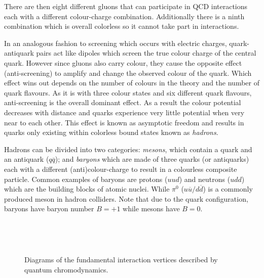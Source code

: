 There are then eight different gluons that can participate in QCD interactions each with a different colour-charge combination. Additionally there is a ninth combination which is overall colorless so it cannot take part in interactions.

In an analogous fashion to screening which occurs with electric charges, quark-antiquark pairs act like dipoles which screen the true colour charge of the central quark. However since gluons also carry colour, they cause the opposite effect (anti-screening) to amplify and change the observed colour of the quark. Which effect wins out depends on the number of colours in the theory and the number of quark flavours. As it is with three colour states and six different quark flavours, anti-screening is the overall dominant effect. As a result the colour potential decreases with distance and quarks experience very little potential when very near to each other. This effect is known as asymptotic freedom and results in quarks only existing within colorless bound states known as \textit{hadrons}.

Hadrons can be divided into two categories: \textit{mesons}, which contain a quark and an antiquark ($q\overline{q}$); and \textit{baryons} which are made of three quarks (or antiquarks) each with a different (anti)colour-charge to result in a colourless composite particle. Common examples of baryons are protons ($uud$) and neutrons ($udd$) which are the building blocks of atomic nuclei. While $\pi^{0}$ ($u\overline{u}/d\overline{d}$) is a commonly produced meson in hadron colliders. Note that due to the quark configuration, baryons have baryon number $B=+1$ while mesons have $B=0$.
  
\begin{figure}
  \begin{minipage}[][][t]{.32\textwidth}
    
     \label{fig:TheoryQCDColour}
  \end{minipage}
  \,
  \begin{minipage}[][][t]{.32\textwidth}
    \centering
    
     \label{fig:TheoryQCDFourGluon}
  \end{minipage}
  \,
  \begin{minipage}[][][t]{.32\textwidth}
    \centering
    
     \label{fig:TheoryQCDThreeGluon}
  \end{minipage}
  \caption{Diagrams of the fundamental interaction vertices described by quantum chromodynamics.} \label{fig:TheoryQCDVertexes}
\end{figure}

